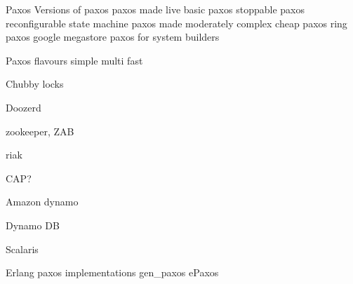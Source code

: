 Paxos
  Versions of paxos
    paxos made live
    basic paxos
    stoppable paxos
    reconfigurable state machine
    paxos made moderately complex
    cheap paxos
    ring paxos
    google megastore
    paxos for system builders
  
  Paxos flavours
    simple
    multi
    fast
    
Chubby locks

Doozerd

zookeeper, ZAB

riak

CAP?

Amazon dynamo

Dynamo DB

Scalaris

Erlang paxos implementations
  gen\_paxos
  ePaxos
  

